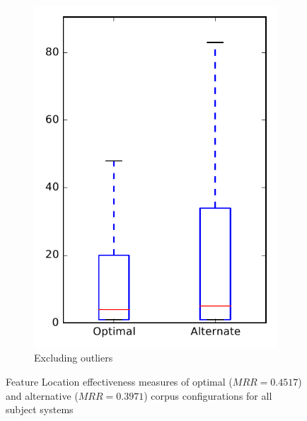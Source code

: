 \begin{figure}
\begin{subfigure}{.4\textwidth}
        \includegraphics[height=0.4\textheight]{figures/combo/flt_rq2_all_no_outlier}
        \caption{Excluding outliers}\label{fig:combo:flt:rq2:all_no_outlier}
    \end{subfigure}
\caption[Feature Location effectiveness measures of optimal and alternative corpus configurations for all subject systems]%
{Feature Location effectiveness measures of optimal ($MRR=0.4517$) and alternative ($MRR=0.3971$) corpus configurations for all subject systems}
\label{fig:combo:flt:rq2:all}
\end{figure}

